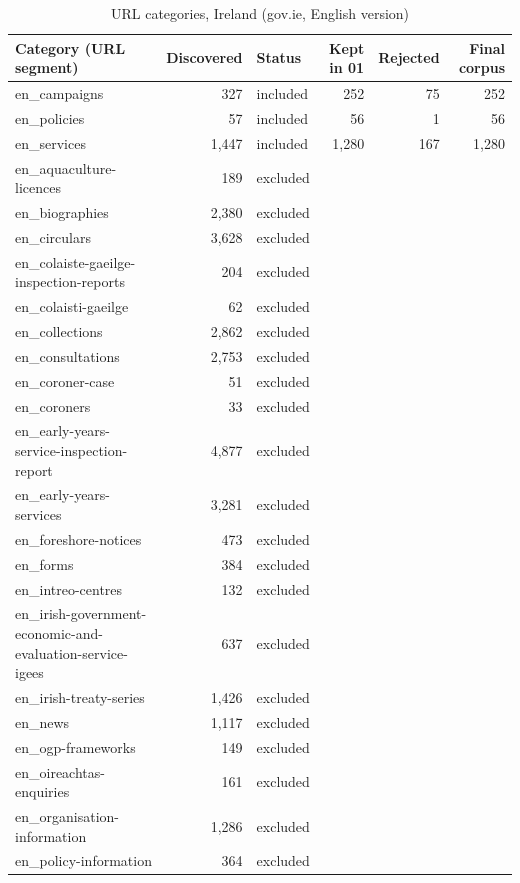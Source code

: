 \begin{table}[htbp]
\centering
\small
\begin{threeparttable}
\caption{URL categories, Ireland (gov.ie, English version)}
\label{tab:dc_categories_ireland}
\begin{tabular}{lrlrrr}
\hline
Category (URL segment) & Discovered & Status & Kept in 01 & Rejected & Final corpus \\
\hline
en\_campaigns & 327 & included & 252 & 75 & 252 \\
en\_policies & 57 & included & 56 & 1 & 56 \\
en\_services & 1,447 & included & 1,280 & 167 & 1,280 \\
en\_aquaculture-licences & 189 & excluded &  &  &  \\
en\_biographies & 2,380 & excluded &  &  &  \\
en\_circulars & 3,628 & excluded &  &  &  \\
en\_colaiste-gaeilge-inspection-reports & 204 & excluded &  &  &  \\
en\_colaisti-gaeilge & 62 & excluded &  &  &  \\
en\_collections & 2,862 & excluded &  &  &  \\
en\_consultations & 2,753 & excluded &  &  &  \\
en\_coroner-case & 51 & excluded &  &  &  \\
en\_coroners & 33 & excluded &  &  &  \\
en\_early-years-service-inspection-report & 4,877 & excluded &  &  &  \\
en\_early-years-services & 3,281 & excluded &  &  &  \\
en\_foreshore-notices & 473 & excluded &  &  &  \\
en\_forms & 384 & excluded &  &  &  \\
en\_intreo-centres & 132 & excluded &  &  &  \\
en\_irish-government-economic-and-evaluation-service-igees & 637 & excluded &  &  &  \\
en\_irish-treaty-series & 1,426 & excluded &  &  &  \\
en\_news & 1,117 & excluded &  &  &  \\
en\_ogp-frameworks & 149 & excluded &  &  &  \\
en\_oireachtas-enquiries & 161 & excluded &  &  &  \\
en\_organisation-information & 1,286 & excluded &  &  &  \\
en\_policy-information & 364 & excluded &  &  &  \\

\end{tabular}
\end{threeparttable}
\end{table}

